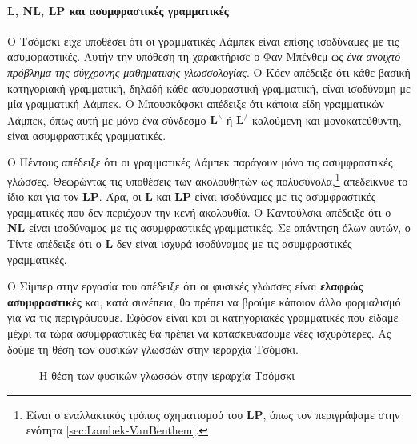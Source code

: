 \documentclass [a4paper,11pt] {book}
\theoremstyle{definition}
\theoremstyle{definition}
\begin{document}
\paragraph{\textbf{L}, \textbf{NL}, \textbf{LP} και ασυμφραστικές γραμματικές}
Ο Τσόμσκι \citep{chomsky1963} είχε υποθέσει ότι οι γραμματικές Λάμπεκ είναι επίσης ισοδύναμες με τις ασυμφραστικές. Αυτήν την υπόθεση τη χαρακτήρισε ο Φαν Μπένθεμ \citep{Benthem1991-BENLIA} ως \textit{ένα ανοιχτό πρόβλημα της σύγχρονης μαθηματικής γλωσσολογίας}. Ο Κόεν \citep{Cohen1967475} απέδειξε ότι κάθε βασική κατηγοριακή γραμματική, δηλαδή κάθε ασυμφραστική γραμματική, είναι ισοδύναμη με μία γραμματική Λάμπεκ. O Μπουσκόφσκι \citep{MALQ:MALQ19850312402} απέδειξε ότι κάποια είδη γραμματικών Λάμπεκ, όπως αυτή με μόνο ένα σύνδεσμο $\textbf{L}^{\backslash}$ ή $\textbf{L}^{/}$ καλούμενη και μονοκατεύθυντη, είναι ασυμφραστικές γραμματικές.

Ο Πέντους \citep{Pentus93LICS} απέδειξε ότι οι γραμματικές Λάμπεκ παράγουν μόνο τις ασυμφραστικές γλώσσες. Θεωρώντας τις υποθέσεις των ακολουθητών ως πολυσύνολα,\footnote{Είναι ο εναλλακτικός τρόπος σχηματισμού του \textbf{LP}, όπως τον περιγράψαμε στην ενότητα \ref{sec:Lambek-VanBenthem}.} απεδείκνυε το ίδιο και για τον \textbf{LP}. Άρα, οι \textbf{L} και \textbf{LP} είναι ισοδύναμες με τις ασυμφραστικές γραμματικές που δεν περιέχουν την κενή ακολουθία. Ο Καντούλσκι \citep{MALQ:MALQ19880340106} απέδειξε ότι ο \textbf{NL} είναι ισοδύναμος με τις ασυμφραστικές γραμματικές. Σε απάντηση όλων αυτών, ο Τίντε \citep{tiede1999deductive} απέδειξε ότι ο \textbf{L} δεν είναι ισχυρά ισοδύναμος με τις ασυμφραστικές γραμματικές.

Ο Σίμπερ στην εργασία του \citep{citeulike:3363352} απέδειξε ότι οι φυσικές γλώσσες είναι \textbf{ελαφρώς ασυμφραστικές} και, κατά συνέπεια, θα πρέπει να βρούμε κάποιον άλλο φορμαλισμό για να τις περιγράψουμε. Εφόσον είναι και οι κατηγοριακές γραμματικές που είδαμε μέχρι τα τώρα ασυμφραστικές θα πρέπει να κατασκευάσουμε νέες ισχυρότερες. Ας δούμε τη θέση των φυσικών γλωσσών στην ιεραρχία Τσόμσκι.
\begin{figure}[H]
\centering
{}
\caption{Η θέση των φυσικών γλωσσών στην ιεραρχία Τσόμσκι}
\label{naturalLanguagesInCH}
\end{figure}
\end{document}
